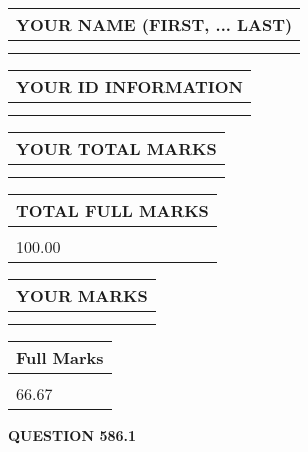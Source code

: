 \documentclass{ctexart}
\begin{document}
   
   
   
\newpage 
\setcounter{page}{ 
   586001 } 
   
   
   
   
\noindent\begin{tabular}{|l|}
\hline
YOUR NAME (FIRST, ... LAST)  \\
\hline
 \\ 
 \\ 
\hline
\end{tabular}
\hspace{0.05in} \begin{tabular}{|l|}
\hline
 YOUR   ID   INFORMATION  \\
\hline
 \\ 
 \\ 
\hline
\end{tabular}
   
   
\vspace{0.2in}\noindent\begin{tabular}{|l|}
\hline
YOUR TOTAL MARKS  \\
\hline
 \\ 
 \\ 
\hline
\end{tabular}
\hspace{0.05in} \begin{tabular}{|l|}
\hline
TOTAL FULL MARKS  \\
\hline
 \\ 
100.00 \\
\hline
\end{tabular}
   
   
 \vspace{0.2in}
 
 
 
 
   
   
  
\vspace{0.2in}
  
\noindent\begin{tabular}{|l|}
\hline
 YOUR MARKS  \\
\hline
 \\ 
 \\ 
\hline
\end{tabular}
\hspace{0.05in} \begin{tabular}{|l|}
\hline
 Full Marks  \\
\hline
 \\ 
66.67 \\
\hline
\end{tabular}
{\textbf{\Large{QUESTION
586.1 
}}}
  
\end{document}
